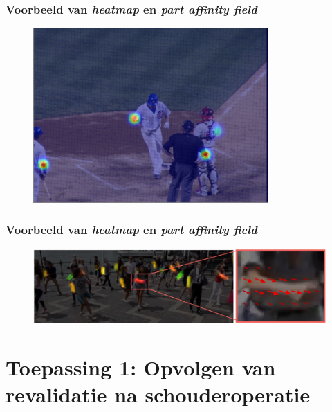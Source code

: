 \documentclass
   [kulak] %
   {kulakbeamer}
\begin{document}
\begin{frame}
\frametitle{Voorbeeld van \textit{heatmap} en \textit{part affinity field}}
	\begin{figure}
		\centering
		\includegraphics[width=0.8\textwidth]{heatmap_1}
	\end{figure}
\end{frame}
\begin{frame}
\frametitle{Voorbeeld van \textit{heatmap} en \textit{part affinity field}}
	\begin{figure}
		\centering
		\includegraphics[width=\textwidth]{PAF}
	\end{figure}
\end{frame}

\section{Toepassing 1: Opvolgen van revalidatie na schouderoperatie}
\end{document}
